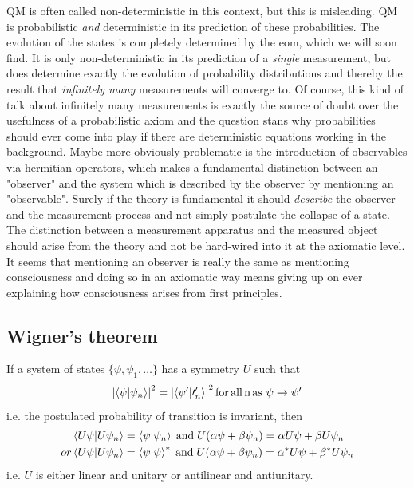QM is often called non-deterministic in this context, but this is misleading. QM is probabilistic \emph{and} deterministic in its prediction of these probabilities. The evolution of the states is completely determined by the eom, which we will soon find. It is only non-deterministic in its prediction of a \emph{single} measurement, but does determine exactly the evolution of probability distributions and thereby the result that \emph{infinitely many } measurements will converge to. Of course, this kind of talk about infinitely many measurements is exactly the source of doubt over the usefulness of a probabilistic axiom and the question stans why probabilities should ever come into play if there are deterministic equations working in the background. Maybe more obviously problematic is the introduction of observables via hermitian operators, which makes a fundamental distinction between an "observer" and the system which is described by the observer by mentioning an "observable". Surely if the theory is fundamental it should \emph{describe} the observer and the measurement process and not simply postulate the collapse of a state. The distinction between a measurement apparatus and the measured object should arise from the theory and not be hard-wired into it at the axiomatic level. It seems that mentioning an observer is really the same as mentioning consciousness and doing so in an axiomatic way means giving up on ever explaining how consciousness arises from first principles.


\subsection{Wigner's theorem}
If a system of states $\{\psi,\psi_1,\dots\}$ has a symmetry $U$ such that
\begin{equation}
	\abs{\braket{\psi}{\psi_n}}^2 = \abs{\braket{\psi^\prime}{\prime^\prime_n}}^2 \mathrm{\, for\,all\,}$n$\, \text{as } \psi \rightarrow \psi^\prime
\end{equation}
i.e. the postulated probability of transition is invariant, then
\begin{align}
	\braket{U\psi}{U\psi_n} &= \braket{\psi}{\psi_n} \; \mathrm{and} \; U(\alpha \psi + \beta \psi_n) = \alpha U \psi + \beta U \psi_n \\
	or \braket{U\psi}{U\psi_n} &= \braket{\psi}{\psi}^* \; \mathrm{and\;} U(\alpha \psi+ \beta \psi_n) = \alpha^* U\psi + \beta^* U \psi_n
\end{align}
i.e. $U$ is either linear and unitary or antilinear and antiunitary.
